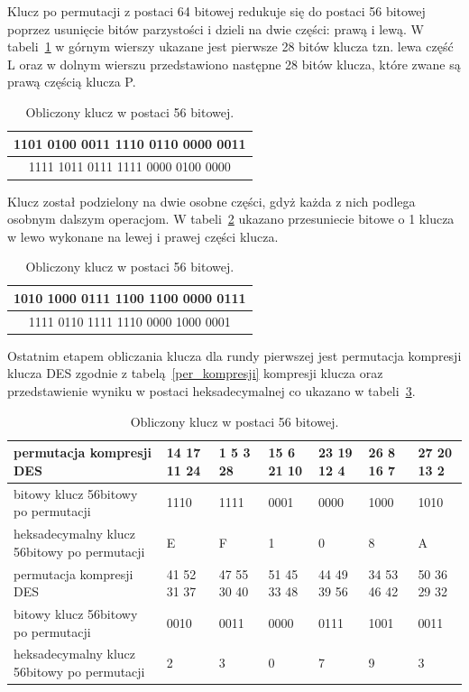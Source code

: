 \documentclass[12p]{article}
\begin{document}
Klucz po permutacji z postaci 64 bitowej redukuje się do postaci 56 bitowej poprzez usunięcie bitów parzystości i dzieli na dwie części: prawą i lewą. W tabeli~\ref{LP} w górnym wierszy ukazane jest pierwsze 28 bitów klucza tzn. lewa część L oraz w dolnym wierszu przedstawiono następne 28 bitów klucza, które zwane są prawą częścią klucza P.

\begin{table}[H]
\centering
\begin{tabular}{|c|}
\hline
1101 0100 0011 1110 0110 0000 0011\\
\hline
1111 1011 0111 1111 0000 0100 0000\\
\hline
\end{tabular}
\caption{Obliczony klucz w postaci 56 bitowej.}\label{LP}
\end{table}

Klucz został podzielony na dwie osobne części, gdyż każda z nich podlega osobnym dalszym operacjom. W tabeli~\ref{shift} ukazano przesuniecie bitowe o 1 klucza w lewo wykonane na lewej i prawej części klucza.

\begin{table}[H]
\centering
\begin{tabular}{|c|}
\hline
1010 1000 0111 1100 1100 0000 0111\\
\hline
1111 0110 1111 1110 0000 1000 0001\\
\hline
\end{tabular}
\caption{Obliczony klucz w postaci 56 bitowej.}\label{shift}
\end{table}

Ostatnim etapem obliczania klucza dla rundy pierwszej jest permutacja kompresji klucza DES zgodnie z tabelą~\ref{per_kompresji} kompresji klucza oraz przedstawienie wyniku w postaci heksadecymalnej co ukazano w tabeli~\ref{56}.

\begin{table}[H]
\centering
\begin{tabular}{ | p{3cm} | p{1.7cm} | p{1.7cm} | p{1.7cm} | p{1.7cm} | p{1.7cm} | p{1.7cm} |}
\hline
permutacja kompresji DES & 14 17 11 24  & 1 5 3 28 &  15 6 21 10 & 23  19 12 4 & 26 8 16 7 & 27 20 13 2\\ \hline
bitowy klucz 56bitowy po permutacji & 1110 & 1111 & 0001 & 0000 & 1000 & 1010 \\ \hline
heksadecymalny klucz 56bitowy po permutacji & E & F & 1 & 0 & 8 & A\\
\hline \hline
permutacja kompresji DES & 41 52 31 37 & 47 55 30 40 & 51 45 33 48 & 44 49 39 56 & 34 53 46 42 & 50 36 29 32\\ \hline
bitowy klucz 56bitowy po permutacji & 0010 & 0011 & 0000 & 0111 & 1001 & 0011\\ \hline
heksadecymalny klucz 56bitowy po permutacji & 2 & 3 & 0 & 7 & 9 & 3\\ 
\hline
\end{tabular}
\caption{Obliczony klucz w postaci 56 bitowej.}\label{56}
\end{table}
\end{document}
